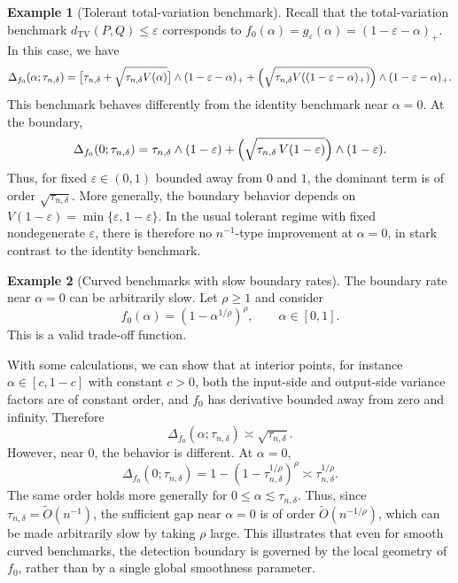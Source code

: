 \documentclass[english]{article}
\theoremstyle{plain}
\theoremstyle{definition}
\newtheorem{example}{Example}[section]
\newcommand{\fnull}{f_0}
\newcommand{\tauND}{\tau_{n,\delta}}               %
\newcommand{\dTV}{d_{\mathrm{TV}}}                 %
\begin{document}
\begin{example}[Tolerant total-variation benchmark]
\label{ex:gap-tv} 
Recall that the total-variation benchmark
\(\dTV(P,Q)\leqslant \varepsilon\) corresponds to
\(\fnull(\alpha)=g_\varepsilon(\alpha)=(1-\varepsilon-\alpha)_+\). 
In this case, we have
\begin{equation}
\Delta_{\fnull}(\alpha;\tauND)
=
\bigl[\tauND+\sqrt{\tauND V(\alpha)}\bigr]\wedge (1-\varepsilon-\alpha)_+
+
\Bigl(\sqrt{\tauND V((1-\varepsilon-\alpha)_+)}\Bigr)\wedge (1-\varepsilon-\alpha)_+.
\label{eq:Delta-tv}
\end{equation}
This benchmark behaves differently from the identity benchmark near
\(\alpha=0\). At the boundary,
\[
\Delta_{\fnull}(0;\tauND)
=
\tauND\wedge(1-\varepsilon)
+
\Bigl(\sqrt{\tauND\,V(1-\varepsilon)}\Bigr)\wedge(1-\varepsilon).
\]
Thus, for fixed \(\varepsilon\in(0,1)\) bounded away from \(0\) and \(1\), the
dominant term is of order \(\sqrt{\tauND}\). More generally, the boundary
behavior depends on \(V(1-\varepsilon)=\min\{\varepsilon,1-\varepsilon\}\).
In the usual tolerant regime with fixed nondegenerate \(\varepsilon\), there is
therefore no \(n^{-1}\)-type improvement at \(\alpha=0\), in stark contrast to
the identity benchmark.
\end{example}


\begin{example}[Curved benchmarks with slow boundary rates]
\label{ex:gap-sqrt}
The boundary rate near \(\alpha=0\) can be arbitrarily slow. Let \(\rho\geqslant 1\)
and consider
\[
\fnull(\alpha)=(1-\alpha^{1/\rho})^\rho,\qquad \alpha\in[0,1].
\]
This is a valid trade-off function.

With some calculations, we can show that at interior points, for instance \(\alpha\in[c,1-c]\) with constant
\(c>0\), both the input-side and output-side variance factors are of constant
order, and \(\fnull\) has derivative bounded away from zero and infinity.
Therefore
\[
\Delta_{\fnull}(\alpha;\tauND)\asymp \sqrt{\tauND}.
\]
However, near $0$, the behavior is different. At \(\alpha=0\),
\[
\Delta_{\fnull}(0;\tauND)
=
1-(1-\tauND^{1/\rho})^\rho
\asymp \tauND^{1/\rho}.
\]
The same order holds more generally for \(0\leqslant \alpha\lesssim \tauND\).
Thus, since \(\tauND=\widetilde O(n^{-1})\), the sufficient gap near
\(\alpha=0\) is of order \(\widetilde O(n^{-1/\rho})\), which can be made
arbitrarily slow by taking \(\rho\) large. This illustrates that even for smooth
curved benchmarks, the detection boundary is governed by the local geometry of
\(\fnull\), rather than by a single global smoothness parameter.
\end{example}
\end{document}
